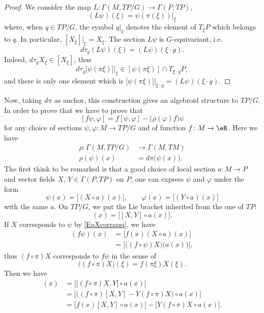 \begin{proof}
 We consider the map $L\colon \Gamma(M,TP/G)\to \Gamma(P,TP)$,
\[
  (L\psi)(\xi)=\psi(\pi(\xi))|_{\xi}
\]
where, when $q\in TP/G$, the symbol $q|_{\xi}$ denotes the element of $T_{\xi} P$ which belongs to $q$. In particular, $[X_{\xi}]|_{\xi}=X_{\xi}$. The section $L\psi$ is $G$-equivariant, i.e.
\begin{equation}
 d\tau_{g}(L\psi)(\xi)=(L\psi)(\xi\cdot g).
\end{equation}
Indeed, $d\tau_{g}X_{\xi}\in [X_{\xi}]$, thus
\[
  d\tau_{g}\big[ \psi(\pi\xi) \big]|_{\xi}\in [\psi(\pi\xi)]\cap T_{\xi\cdot g}P,
\]
and there is only one element which is $\big[ \psi(\pi\xi) \big]|_{\xi\cdot g}=(L\psi)(\xi\cdot g)$.
\end{proof}

Now, taking $d\pi$ as anchor, this construction gives an algebroid structure to $TP/G$. In order to prove that we have to prove that
\[
  [f\psi,\varphi]=f[\psi,\varphi]-\big( \rho(\varphi)f \big)\psi
\]
for any choice of sections $\psi,\varphi\colon M\to TP/G$ and of function $f\colon M\to \eR$. Here we have
\begin{equation}
\begin{aligned}
 \rho\colon \Gamma(M,TP/G)&\to \Gamma(M,TM) \\
\rho(\psi)(x)& =d\pi\big( \psi(x) \big).
\end{aligned}
\end{equation}
The first think to be remarked is that a good choice of local section $a\colon M\to P$ and vector fields $X$, $Y\in\Gamma(P,TP)$ on $P$, one can express $\psi$ and $\varphi$ under the form
\begin{equation}  \label{EqXcorrapsi}
\psi(x)=\big[ (X\circ a)(x) \big],\qquad \varphi(x)=\big[ (Y\circ a)(x) \big]
\end{equation}
with the same $a$. On $TP/G$, we put the Lie bracket inherited from the one of $TP$:
\begin{equation}
[\psi,\varphi](x)=\Big[ [X,Y]\circ a(x) \Big].
\end{equation}
If $X$ corresponds to $\psi$ by \eqref{EqXcorrapsi}, we have
\begin{align*}
  (f\psi)(x)&=\Big[ f(x)(X\circ a)(x) \Big]\\
		&=\Big[ \big( (f\circ\psi)X \big)\big( a(x) \big) \Big],
\end{align*}
thus $(f\circ \pi)X$ corresponds to $f\psi$ in the sense of
\[
  \Big( (f\circ \pi)X \Big)(\xi)=f(\pi\xi)X(\xi).
\]
Then we have
\begin{align*}
  [f\psi,\varphi](x)&=\Big[ \big[ (f\circ\pi)X,Y \big]\circ a(x) \Big]\\
		&=\Big[ \big( (f\circ\pi)[X,Y]-Y(f\circ\pi)X \big)\circ a(x) \Big]\\
		&=\big[ f(x)[X,Y]\circ a(x) \big]-\big[ Y(f\circ\pi)X\circ a(x) \big].
\end{align*}
